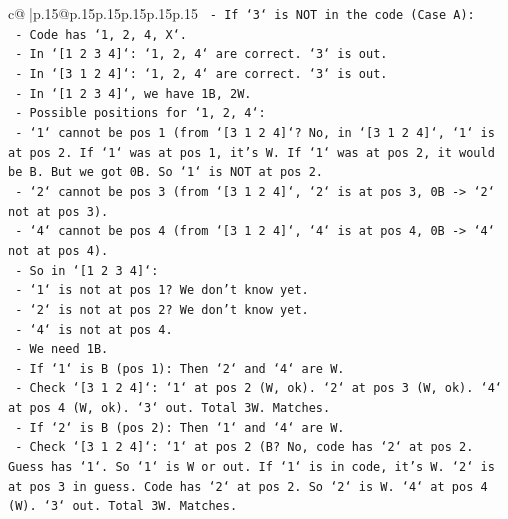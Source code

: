\documentclass{article}
\begin{document}
{\begin{supertabular}{c@{$\;$}|p{.15\linewidth}@{}p{.15\linewidth}p{.15\linewidth}p{.15\linewidth}p{.15\linewidth}p{.15\linewidth}}
{{{\texttt{                {-} If `3` is NOT in the code (Case A):} \\
\texttt{                    {-} Code has `1, 2, 4, X`.} \\
\texttt{                    {-} In `{[}1 2 3 4{]}`: `1, 2, 4` are correct. `3` is out.} \\
\texttt{                    {-} In `{[}3 1 2 4{]}`: `1, 2, 4` are correct. `3` is out.} \\
\texttt{                    {-} In `{[}1 2 3 4{]}`, we have 1B, 2W.} \\
\texttt{                        {-} Possible positions for `1, 2, 4`:} \\
\texttt{                        {-} `1` cannot be pos 1 (from `{[}3 1 2 4{]}`? No, in `{[}3 1 2 4{]}`, `1` is at pos 2. If `1` was at pos 1, it's W. If `1` was at pos 2, it would be B. But we got 0B. So `1` is NOT at pos 2.} \\
\texttt{                        {-} `2` cannot be pos 3 (from `{[}3 1 2 4{]}`, `2` is at pos 3, 0B {-}> `2` not at pos 3).} \\
\texttt{                        {-} `4` cannot be pos 4 (from `{[}3 1 2 4{]}`, `4` is at pos 4, 0B {-}> `4` not at pos 4).} \\
\texttt{                        {-} So in `{[}1 2 3 4{]}`:} \\
\texttt{                            {-} `1` is not at pos 1? We don't know yet.} \\
\texttt{                            {-} `2` is not at pos 2? We don't know yet.} \\
\texttt{                            {-} `4` is not at pos 4.} \\
\texttt{                            {-} We need 1B.} \\
\texttt{                            {-} If `1` is B (pos 1): Then `2` and `4` are W.} \\
\texttt{                                {-} Check `{[}3 1 2 4{]}`: `1` at pos 2 (W, ok). `2` at pos 3 (W, ok). `4` at pos 4 (W, ok). `3` out. Total 3W. Matches.} \\
\texttt{                            {-} If `2` is B (pos 2): Then `1` and `4` are W.} \\
\texttt{                                {-} Check `{[}3 1 2 4{]}`: `1` at pos 2 (B? No, code has `2` at pos 2. Guess has `1`. So `1` is W or out. If `1` is in code, it's W. `2` is at pos 3 in guess. Code has `2` at pos 2. So `2` is W. `4` at pos 4 (W). `3` out. Total 3W. Matches.} \\
}}}
\end{supertabular}}
\end{document}
